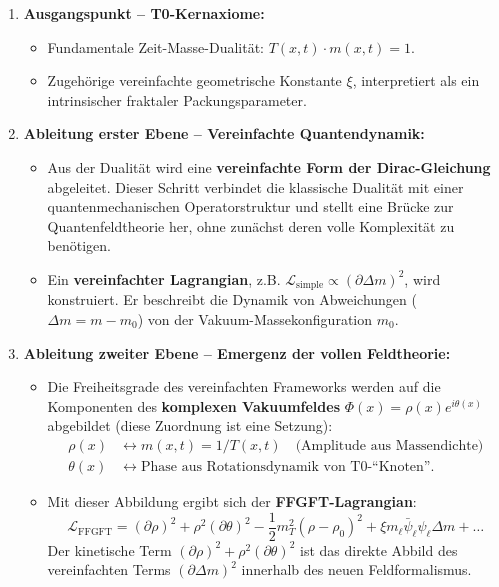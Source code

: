 	\begin{enumerate}
		\item \textbf{Ausgangspunkt – T0-Kernaxiome:}
		\begin{itemize}
			\item Fundamentale Zeit-Masse-Dualität: \( T(x,t) \cdot m(x,t) = 1 \).
			\item Zugehörige vereinfachte geometrische Konstante \( \xi \), interpretiert als ein intrinsischer fraktaler Packungsparameter.
		\end{itemize}
		
		\item \textbf{Ableitung erster Ebene – Vereinfachte Quantendynamik:}
		\begin{itemize}
			\item Aus der Dualität wird eine \textbf{vereinfachte Form der Dirac-Gleichung} abgeleitet. Dieser Schritt verbindet die klassische Dualität mit einer quantenmechanischen Operatorstruktur und stellt eine Brücke zur Quantenfeldtheorie her, ohne zunächst deren volle Komplexität zu benötigen.
			\item Ein \textbf{vereinfachter Lagrangian}, z.B. \( \mathcal{L}_{\text{simple}} \propto (\partial \Delta m)^2 \), wird konstruiert. Er beschreibt die Dynamik von Abweichungen (\( \Delta m = m - m_0 \)) von der Vakuum-Massekonfiguration \( m_0 \).
		\end{itemize}
		
		\item \textbf{Ableitung zweiter Ebene – Emergenz der vollen Feldtheorie:}
		\begin{itemize}
			\item Die Freiheitsgrade des vereinfachten Frameworks werden auf die Komponenten des \textbf{komplexen Vakuumfeldes} \( \Phi(x) = \rho(x) e^{i\theta(x)} \) abgebildet (diese Zuordnung ist eine Setzung):
			\begin{align*}
				\rho(x) &\leftrightarrow m(x,t) = 1/T(x,t) \quad \text{(Amplitude aus Massendichte)} \\
				\theta(x) &\leftrightarrow \text{Phase aus Rotationsdynamik von T0-``Knoten''}.
			\end{align*}
			\item Mit dieser Abbildung ergibt sich der \textbf{FFGFT-Lagrangian}:
			\[
			\mathcal{L}_{\text{FFGFT}} = (\partial \rho)^2 + \rho^2 (\partial \theta)^2 - \frac{1}{2} m_T^2 (\rho - \rho_0)^2 + \xi m_\ell \bar{\psi}_\ell \psi_\ell \Delta m + \dots
			\]
			Der kinetische Term \( (\partial \rho)^2 + \rho^2 (\partial \theta)^2 \) ist das direkte Abbild des vereinfachten Terms \( (\partial \Delta m)^2 \) innerhalb des neuen Feldformalismus.
		\end{itemize}
	\end{enumerate}
	
